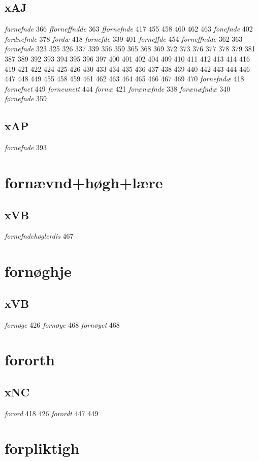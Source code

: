 \documentclass[a4paper,twocolumn]{article}
\begin{document}
\subsection{xAJ}
\label{sec:orga29a316}
\emph{farnefnde} 366 \emph{fforneffndde} 363 \emph{ffornefnde} 417 455 458 460 462 463 \emph{fonefnde} 402 \emph{fordnefnde} 378 \emph{fordæ} 418 \emph{fornefde} 339 401 \emph{forneffde} 454 \emph{forneffndde} 362 363 \emph{fornefnde} 323 325 326 337 339 356 359 365 368 369 372 373 376 377 378 379 381 387 389 392 393 394 395 396 397 400 401 402 404 409 410 411 412 413 414 416 419 421 422 424 425 426 430 433 434 435 436 437 438 439 440 442 443 444 446 447 448 449 455 458 459 461 462 463 464 465 466 467 469 470 \emph{fornefndæ} 418 \emph{fornefnet} 449 \emph{forneunett} 444 \emph{fornæ} 421 \emph{forænæfnde} 338 \emph{forænæfndæ} 340 \emph{førnefnde} 359 
\subsection{xAP}
\label{sec:org5159ad2}
\emph{fornefnde} 393 
\section{fornævnd+høgh+lære}
\label{sec:org73966de}
\subsection{xVB}
\label{sec:org4a1a9d3}
\emph{fornefndehøglerdis} 467 
\section{fornøghje}
\label{sec:org3be54e1}
\subsection{xVB}
\label{sec:org95cf4c7}
\emph{fornøge} 426 \emph{fornøye} 468 \emph{fornøyet} 468 
\section{fororth}
\label{sec:org548ae25}
\subsection{xNC}
\label{sec:orgdb42568}
\emph{forord} 418 426 \emph{forordt} 447 449 
\section{forpliktigh}
\label{sec:org14f61fe}
\end{document}
